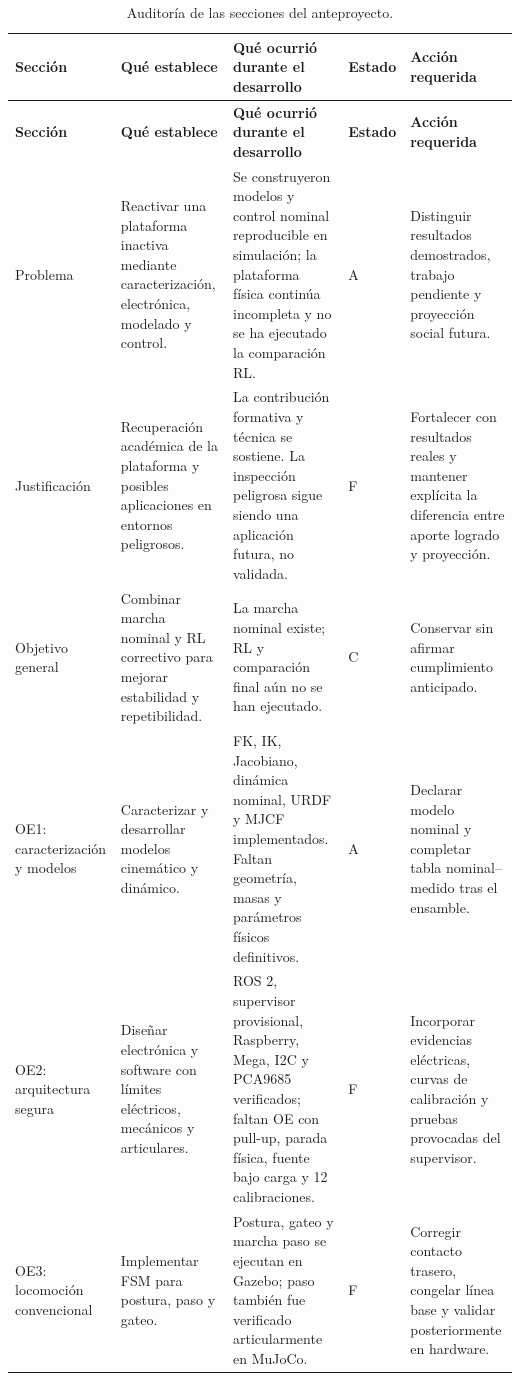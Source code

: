 \documentclass[11pt,letterpaper]{article}
\begin{document}
\begin{landscape}
\small
\begin{longtable}{p{2.6cm}p{5.0cm}p{6.1cm}p{1.8cm}p{6.0cm}}
\caption{Auditoría de las secciones del anteproyecto.}\\
\toprule
\textbf{Sección} & \textbf{Qué establece} & \textbf{Qué ocurrió durante el desarrollo} & \textbf{Estado} & \textbf{Acción requerida}\\
\midrule
\endfirsthead
\toprule
\textbf{Sección} & \textbf{Qué establece} & \textbf{Qué ocurrió durante el desarrollo} & \textbf{Estado} & \textbf{Acción requerida}\\
\midrule
\endhead
Problema & Reactivar una plataforma inactiva mediante caracterización, electrónica, modelado y control. & Se construyeron modelos y control nominal reproducible en simulación; la plataforma física continúa incompleta y no se ha ejecutado la comparación RL. & A & Distinguir resultados demostrados, trabajo pendiente y proyección social futura.\\
Justificación & Recuperación académica de la plataforma y posibles aplicaciones en entornos peligrosos. & La contribución formativa y técnica se sostiene. La inspección peligrosa sigue siendo una aplicación futura, no validada. & F & Fortalecer con resultados reales y mantener explícita la diferencia entre aporte logrado y proyección.\\
Objetivo general & Combinar marcha nominal y RL correctivo para mejorar estabilidad y repetibilidad. & La marcha nominal existe; RL y comparación final aún no se han ejecutado. & C & Conservar sin afirmar cumplimiento anticipado.\\
OE1: caracterización y modelos & Caracterizar y desarrollar modelos cinemático y dinámico. & FK, IK, Jacobiano, dinámica nominal, URDF y MJCF implementados. Faltan geometría, masas y parámetros físicos definitivos. & A & Declarar modelo nominal y completar tabla nominal--medido tras el ensamble.\\
OE2: arquitectura segura & Diseñar electrónica y software con límites eléctricos, mecánicos y articulares. & ROS 2, supervisor provisional, Raspberry, Mega, I2C y PCA9685 verificados; faltan OE con pull-up, parada física, fuente bajo carga y 12 calibraciones. & F & Incorporar evidencias eléctricas, curvas de calibración y pruebas provocadas del supervisor.\\
OE3: locomoción convencional & Implementar FSM para postura, paso y gateo. & Postura, gateo y marcha paso se ejecutan en Gazebo; paso también fue verificado articularmente en MuJoCo. & F & Corregir contacto trasero, congelar línea base y validar posteriormente en hardware.\\

\end{longtable}
\end{landscape}
\end{document}
